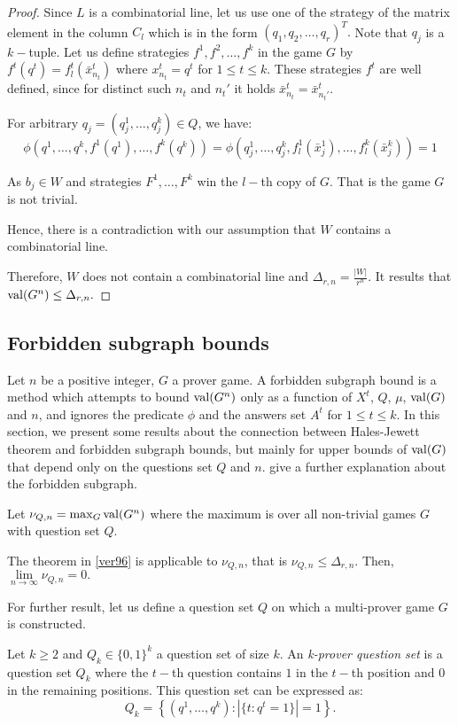 \begin{proof}
Since $L$ is a combinatorial line, let us use one of the strategy of the matrix element in the column $C_l$ which is in the form $(q_1,q_2,\ldots,q_r)^T.$  Note that $q_j$ is a $k-$tuple. 
Let us define strategies $f^1,f^2, \ldots, f^k$ in the game $G$ by $f^t(q^t)=f_l^t(\bar{x}_{n_t}^t)$ where $x_{n_t}^t=q^t$ for $1\leq t \leq k.$ These strategies $f^t$ are well defined, since for distinct such $n_t$ and $n_t'$ it holds $\bar{x}_{n_t}^t= \bar{x}_{n_t'}^t.$ 

For  arbitrary $q_j= (q_j^1,\ldots, q_j^k) \in Q$, we have:
$$\phi (q^1,\ldots, q^k, f^1(q^1), \ldots, f^k(q^k))= \phi (q_j^1,\ldots, q_j^k, f_l^1(\bar{x}_j^1), \ldots, f_l^k(\bar{x}_j^k))=1$$

As $b_j \in W$ and strategies $F^1, \ldots, F^k$ win the $l-$th copy of $G$. That is the game $G$ is not trivial.

Hence, there is a contradiction with our assumption that $W$ contains a combinatorial line.

Therefore, $W$ does not contain a combinatorial line and $\Delta_{r,n}= \frac{|W|}{r^n}$. It results that $\mathrm{val} (G^n) \leq \Delta_{r,n}.$
\end{proof}
 

\subsection{Forbidden subgraph bounds}
 
Let $n$ be a positive integer, $G$ a prover game. A forbidden subgraph bound is a method which attempts  to  bound $\mathrm{val} (G^n)$ only as a function of $X^t$, $Q$, $\mu$, $\mathrm{val} (G)$ and $n$, and ignores the predicate $\phi$ and the answers set $A^t$ for $1\leq t \leq k.$ In this section, we present some results about the connection between Hales-Jewett theorem and forbidden subgraph bounds, but mainly for upper bounds of $\mathrm{val} (G)$ that depend only on the questions set $Q$ and $n.$ \cite{feige1996error} give a further explanation about the forbidden subgraph.

Let $\nu_{Q,n}=\max_G \mathrm{val} (G^n)$ where the maximum is over all non-trivial games $G$ with question set $Q.$

The theorem in \eqref{ver96} is applicable to $\nu_{Q,n}$, that is $\nu_{Q,n} \leq \Delta_{r,n}.$ Then, $\lim\limits_{n\longrightarrow \infty} \nu_{Q,n}=0.$

For further result, let us define a question set $Q$ on which a multi-prover game $G$ is constructed.

\begin{defn}Let $k\geq 2$ and $Q_k \in \{0,1\}^k$ a question set of size $k.$ An \textit{k-prover question set} is a question set $Q_k$ where the $t-$th question contains $1$ in the $t-$th position and $0$ in the remaining positions. This question set can be expressed as:
$$Q_k=\left\lbrace(q^1, \ldots, q^k): |\{t:q^t=1\}|=1\right\rbrace.$$		\end{defn}
 

